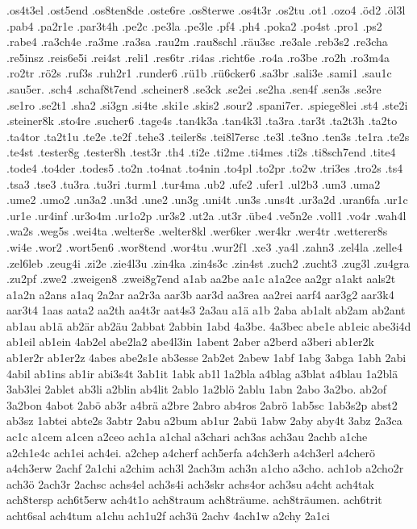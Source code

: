 {.os4t3el
.ost5end
.os8ten8de
.oste6re
.os8terwe
.os4t3r
.os2tu
.ot1
.ozo4
.öd2
.öl3l
.pab4
.pa2r1e
.par3t4h
.pe2c
.pe3la
.pe3le
.pf4
.ph4
.poka2
.po4st
.pro1
.ps2
.rabe4
.ra3ch4e
.ra3me
.ra3sa
.rau2m
.rau8schl
.räu3sc
.re3ale
.reb3s2
.re3cha
.re5insz
.reis6e5i
.rei4st
.reli1
.res6tr
.ri4as
.richt6e
.ro4a
.ro3be
.ro2h
.ro3m4a
.ro2tr
.rö2s
.ruf3s
.ruh2r1
.runder6
.rü1b
.rü6cker6
.sa3br
.sali3e
.sami1
.sau1c
.sau5er.
.sch4
.schaf8t7end
.scheiner8
.se3ck
.se2ei
.se2ha
.sen4f
.sen3s
.se3re
.se1ro
.se2t1
.sha2
.si3gn
.si4te
.ski1e
.skis2
.sour2
.spani7er.
.spiege8lei
.st4
.ste2i
.steiner8k
.sto4re
.sucher6
.tage4s
.tan4k3a
.tan4k3l
.ta3ra
.tar3t
.ta2t3h
.ta2to
.ta4tor
.ta2t1u
.te2e
.te2f
.tehe3
.teiler8s
.tei8l7ersc
.te3l
.te3no
.ten3s
.te1ra
.te2s
.te4st
.tester8g
.tester8h
.test3r
.th4
.ti2e
.ti2me
.ti4mes
.ti2s
.ti8sch7end
.tite4
.tode4
.to4der
.todes5
.to2n
.to4nat
.to4nin
.to4pl
.to2pr
.to2w
.tri3es
.tro2s
.ts4
.tsa3
.tse3
.tu3ra
.tu3ri
.turm1
.tur4ma
.ub2
.ufe2
.ufer1
.ul2b3
.um3
.uma2
.ume2
.umo2
.un3a2
.un3d
.une2
.un3g
.uni4t
.un3s
.uns4t
.ur3a2d
.uran6fa
.ur1c
.ur1e
.ur4inf
.ur3o4m
.ur1o2p
.ur3s2
.ut2a
.ut3r
.übe4
.ve5n2e
.voll1
.vo4r
.wah4l
.wa2s
.weg5s
.wei4ta
.welter8e
.welter8kl
.wer6ker
.wer4kr
.wer4tr
.wetterer8s
.wi4e
.wor2
.wort5en6
.wor8tend
.wor4tu
.wur2f1
.xe3
.ya4l
.zahn3
.zel4la
.zelle4
.zel6leb
.zeug4i
.zi2e
.zie4l3u
.zin4ka
.zin4s3c
.zin4st
.zuch2
.zucht3
.zug3l
.zu4gra
.zu2pf
.zwe2
.zweigen8
.zwei8g7end
a1ab
aa2be
aa1c
a1a2ce
aa2gr
a1akt
aals2t
a1a2n
a2ans
a1aq
2a2ar
aa2r3a
aar3b
aar3d
aa3rea
aa2rei
aarf4
aar3g2
aar3k4
aar3t4
1aas
aata2
aa2th
aa4t3r
aat4s3
2a3au
a1ä
a1b
2aba
ab1alt
ab2am
ab2ant
ab1au
ab1ä
ab2är
ab2äu
2abbat
2abbin
1abd
4a3be.
4a3bec
abe1e
ab1eic
abe3i4d
ab1eil
ab1ein
4ab2el
abe2la2
abe4l3in
1abent
2aber
a2berd
a3beri
ab1er2k
ab1er2r
ab1er2z
4abes
abe2s1e
ab3esse
2ab2et
2abew
1abf
1abg
3abga
1abh
2abi
4abil
ab1ins
ab1ir
abi3s4t
3ab1it
1abk
ab1l
1a2bla
a4blag
a3blat
a4blau
1a2blä
3ab3lei
2ablet
ab3li
a2blin
ab4lit
2ablo
1a2blö
2ablu
1abn
2abo
3a2bo.
ab2of
3a2bon
4abot
2abö
ab3r
a4brä
a2bre
2abro
ab4ros
2abrö
1ab5sc
1ab3s2p
abst2
ab3sz
1abtei
abte2s
3abtr
2abu
a2bum
ab1ur
2abü
1abw
2aby
aby4t
3abz
2a3ca
ac1c
a1cem
a1cen
a2ceo
ach1a
a1chal
a3chari
ach3as
ach3au
2achb
a1che
a2ch1e4c
ach1ei
ach4ei.
a2chep
a4cherf
ach5erfa
a4ch3erh
a4ch3erl
a4cherö
a4ch3erw
2achf
2a1chi
a2chim
ach3l
2ach3m
ach3n
a1cho
a3cho.
ach1ob
a2cho2r
ach3ö
2ach3r
2achsc
achs4el
ach3s4i
ach3skr
achs4or
ach3su
a4cht
ach4tak
ach8tersp
ach6t5erw
ach4t1o
ach8traum
ach8träume.
ach8träumen.
ach6trit
acht6sal
ach4tum
a1chu
ach1u2f
ach3ü
2achv
4ach1w
a2chy
2a1ci
}
